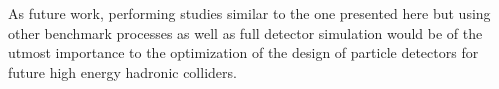 As future work, performing studies similar to the one presented here but using other benchmark processes as well as full detector simulation would be of the utmost importance to the optimization of the design of particle detectors for future high energy hadronic colliders.

%
%
